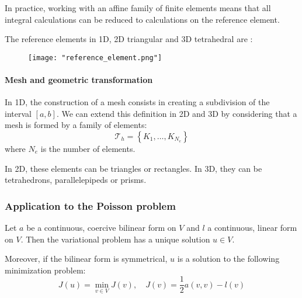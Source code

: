 	
	\begin{Rem}
		In practice, working with an affine family of finite elements means that all integral calculations can be reduced to calculations on the reference element. 
		
		The reference elements in 1D, 2D triangular and 3D tetrahedral are :
		\begin{figure}[H]
			\centering
			\texttt{[image: "reference\_element.png"]}
		\end{figure}
	\end{Rem}

\paragraph{Mesh and geometric transformation}

In 1D, the construction of a mesh consists in creating a subdivision of the interval $[a,b]$. We can extend this definition in 2D and 3D by considering that a mesh is formed by a family of elements:
\begin{equation*}
	\mathcal{T}_h = \left\{K_1,\dots,K_{N_e}\right\}
\end{equation*} 
where $N_e$ is the number of elements. 

In 2D, these elements can be triangles or rectangles. In 3D, they can be tetrahedrons, parallelepipeds or prisms.


%

\subsubsection{Application to the Poisson problem}



\begin{Prop}
	
	Let $a$ be a continuous, coercive bilinear form on $V$ and $l$ a continuous, linear form on $V$. Then the variational problem has a unique solution $u\in V$. 
	
	Moreover, if the bilinear form is symmetrical, $u$ is a solution to the following minimization problem:
	\begin{equation*}
		J(u)=\min_{v\in V} J(v), \quad J(v)=\frac{1}{2}a(v,v)-l(v)
	\end{equation*}
\end{Prop}

